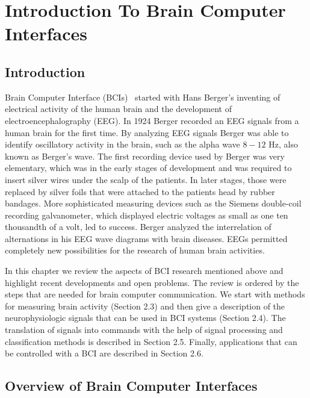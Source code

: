 \chapter{Introduction To Brain Computer Interfaces}


\section{Introduction}\label{ch2:1}

Brain Computer Interface (BCIs)~\cite{1} started with Hans Berger's inventing of electrical activity of the human brain and the development of electroencephalography (EEG). In 1924 Berger recorded an EEG signals from a human brain for the first time. By analyzing EEG signals Berger was able to identify oscillatory activity in the brain, such as the alpha wave $8-12$ Hz, also known as Berger's wave. The first recording device used by Berger was very elementary, which was in the early stages of development and was required to insert silver wires under the scalp of the patients. In later stages, those were replaced by silver foils that were attached to the patients head by rubber bandages. More sophisticated measuring devices such as the Siemens double-coil recording galvanometer, which displayed electric voltages as small as one ten thousandth of a volt, led to success. Berger analyzed the interrelation of alternations in his EEG wave diagrams with brain diseases. EEGs permitted completely new possibilities for the research of human brain activities.

In this chapter we review the aspects of BCI research mentioned above and highlight recent developments and open problems. The review is ordered by the steps that are needed for brain computer communication. We start with methods for measuring brain activity (Section 2.3) and then give a description of the neurophysiologic signals that can be used in BCI systems (Section 2.4).  The translation of signals into commands with the help of signal processing and classification methods is described in Section 2.5. Finally, applications that can be controlled with a BCI are described in Section 2.6.

\section{Overview of Brain Computer Interfaces}\label{ch2:2}     
          
